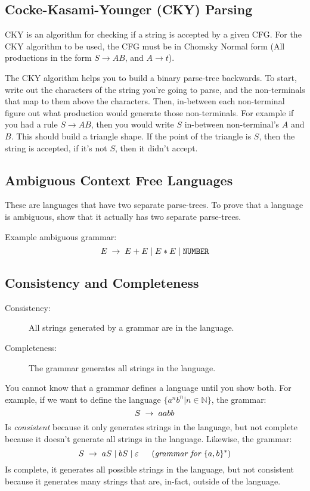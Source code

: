\subsection{Cocke-Kasami-Younger (CKY) Parsing}
CKY is an algorithm for checking if a string is accepted by a given
CFG. For the CKY algorithm to be used, the CFG must be in Chomsky Normal form
(All productions in the form $S \to AB$, and $A \to t$).

The CKY algorithm helps you to build a binary parse-tree backwards. To start,
write out the characters of the string you're going to parse, and the non-terminals
that map to them above the characters. Then, in-between each non-terminal 
figure out what production would generate those non-terminals. For example if you
had a rule $S \to AB$, then you would write $S$ in-between non-terminal's $A$ and
$B$. This should build a triangle shape. If the point of the triangle is $S$, then
the string is accepted, if it's not $S$, then it didn't accept.

\subsection{Ambiguous Context Free Languages}
These are languages that have two separate parse-trees. To prove
that a language is ambiguous, show that it actually has two separate
parse-trees.

Example ambiguous grammar:
\[
    E \;\to\; E + E \;|\; E * E \;|\; \texttt{NUMBER}
\]

\subsection{Consistency and Completeness}
\begin{description}
    \item[{\small Consistency:}] All strings generated by a grammar are 
    in the language.
    \item[{\small Completeness:}] The grammar generates all strings 
    in the language.
\end{description}

You cannot know that a grammar defines a language until you show both.
For example, if we want to define the language $\{a^nb^n | n \in \mathbb{N}\}$,
the grammar:
\[
    S \;\to\; aabb
\]
Is \textit{consistent} because it only generates strings in the language,
but not complete because it doesn't generate all strings in the language.
Likewise, the grammar:
\[
    S \;\to\; aS \;|\; bS \;|\; \varepsilon 
    \;\;\quad (\textit{grammar for }\{a, b\}^*)
\]
Is complete, it generates all possible strings in the language, but not
consistent because it generates many strings that are, in-fact, outside of
the language.
